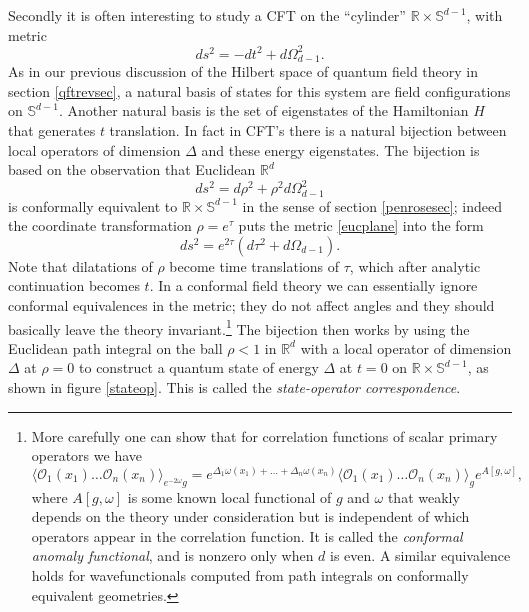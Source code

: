 \documentclass[12pt]{article}
\newcommand{\be}{\begin{equation}}
\newcommand{\ee}{\end{equation}}
\newcommand{\lan}{\langle}
\newcommand{\ran}{\rangle}
\begin{document}
Secondly it is often interesting to study a CFT on the ``cylinder'' $\mathbb{R}\times \mathbb{S}^{d-1}$, with metric
\be\label{cftglobal}
ds^2=-dt^2+d\Omega_{d-1}^2.
\ee
As in our previous discussion of the Hilbert space of quantum field theory in section \ref{qftrevsec}, a natural basis of states for this system are field configurations on $\mathbb{S}^{d-1}$.  Another natural basis is the set of eigenstates of the Hamiltonian $H$ that generates $t$ translation.  In fact in CFT's there is a natural bijection between local operators of dimension $\Delta$ and these energy eigenstates.  The bijection is based on the observation that Euclidean $\mathbb{R}^{d}$
\be\label{eucplane}
ds^2=d\rho^2+\rho^2 d\Omega_{d-1}^2
\ee
is conformally equivalent to $\mathbb{R}\times \mathbb{S}^{d-1}$ in the sense of section \ref{penrosesec};  indeed the coordinate transformation $\rho=e^\tau$ puts the metric \ref{eucplane} into the form
\be
ds^2=e^{2\tau}\left(d\tau^2+d\Omega_{d-1}\right).
\ee
Note that dilatations of $\rho$ become time translations of $\tau$, which after analytic continuation becomes $t$. In a conformal field theory we can essentially ignore conformal equivalences in the metric; they do not affect angles and they should basically leave the theory invariant.\footnote{More carefully one can show that for correlation functions of scalar primary operators we have
\be\label{conftrans}
\lan \mathcal{O}_1(x_1)\ldots \mathcal{O}_n (x_n)\ran_{e^{-2\omega} g}=e^{\Delta_1\omega(x_1)+\ldots +\Delta_n\omega(x_n)}\lan \mathcal{O}_1(x_1)\ldots \mathcal{O}_n (x_n)\ran_{g} e^{A[g,\omega]},
\ee
where $A[g,\omega]$ is some known local functional of $g$ and $\omega$ that weakly depends on the theory under consideration but is independent of which operators appear in the correlation function.  It is called the \textit{conformal anomaly functional}, and is nonzero only when $d$ is even.  A similar equivalence holds for wavefunctionals computed from path integrals on conformally equivalent geometries.}  The bijection then works by using the Euclidean path integral on the ball $\rho<1$ in $\mathbb{R}^{d}$ with a local operator of dimension $\Delta$ at $\rho=0$ to construct a quantum state of energy $\Delta$ at $t=0$ on $\mathbb{R}\times \mathbb{S}^{d-1}$, as shown in figure \ref{stateop}.  This is called the \textit{state-operator correspondence}.
\end{document}
